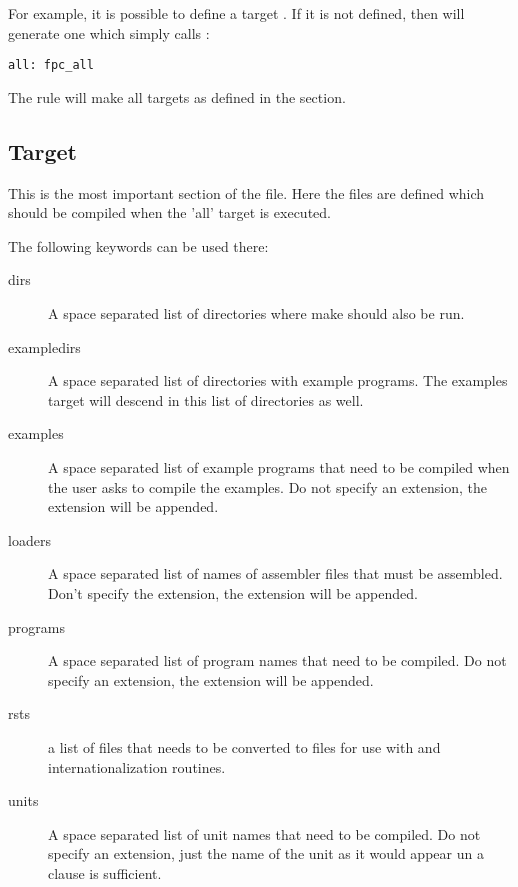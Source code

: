 {For example, it is possible to define a target . If it is not
defined, then \fpcmake{} will generate one which simply calls
:
\begin{verbatim}
all: fpc_all
\end{verbatim}
The  rule will make all targets as defined in the 
section.

\subsection{Target}
This is the most important section of the  file. Here the
files are defined which should be compiled when the 'all' target is
executed. 

The following keywords can be used there:
\begin{description}
\item[dirs]
A space separated list of directories where make should also be run.
\item[exampledirs] 
A space separated list of directories with example programs. The examples
target will descend in this list of directories as well.
\item[examples]
A space separated list of example programs that need to be compiled when
the user asks to compile the examples. Do not specify an extension,
the extension will be appended.
\item[loaders]
A space separated list of names of assembler files that must be assembled.
Don't specify the extension, the extension will be appended.
\item[programs]
A space separated list of program names that need to be compiled. Do not
specify an extension, the extension will be appended.
\item[rsts] a list of  files that needs to be converted to 
files for use with \gnu {} and internationalization routines.
\item[units]
A space separated list of unit names that need to be compiled. Do not
specify an extension, just the name of the unit as it would appear un a
 clause is sufficient.
\end{description}

}
